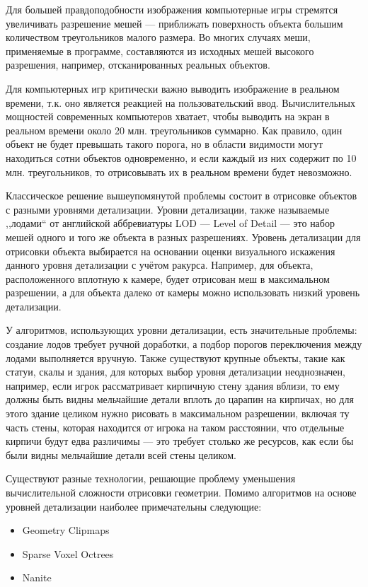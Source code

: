 Для большей правдоподобности изображения компьютерные игры стремятся увеличивать разрешение мешей --- приближать поверхность объекта большим количеством треугольников малого размера.
Во многих случаях меши, применяемые в программе, составляются из исходных мешей высокого разрешения, например, отсканированных реальных объектов.

Для компьютерных игр критически важно выводить изображение в реальном времени, т.к. оно является реакцией на пользовательский ввод.
Вычислительных мощностей современных компьютеров хватает, чтобы выводить на экран в реальном времени около 20 млн. треугольников суммарно.
Как правило, один объект не будет превышать такого порога, но в области видимости могут находиться сотни объектов одновременно, и если каждый из них содержит по 10 млн. треугольников, то отрисовывать их в реальном времени будет невозможно.

Классическое решение вышеупомянутой проблемы состоит в отрисовке объектов с разными уровнями детализации.
Уровни детализации, также называемые ,,лодами`` от английской аббревиатуры LOD --- Level of Detail --- это набор мешей одного и того же объекта в разных разрешениях.
Уровень детализации для отрисовки объекта выбирается на основании оценки визуального искажения данного уровня детализации с учётом ракурса.
Например, для объекта, расположенного вплотную к камере, будет отрисован меш в максимальном разрешении, а для объекта далеко от камеры можно использовать низкий уровень детализации.

У алгоритмов, использующих уровни детализации, есть значительные проблемы: создание лодов требует ручной доработки, а подбор порогов переключения между лодами выполняется вручную.
Также существуют крупные объекты, такие как статуи, скалы и здания, для которых выбор уровня детализации неоднозначен, например, если игрок рассматривает кирпичную стену здания вблизи, то ему должны быть видны мельчайшие детали вплоть до царапин на кирпичах, но для этого здание целиком нужно рисовать в максимальном разрешении, включая ту часть стены, которая находится от игрока на таком расстоянии, что отдельные кирпичи будут едва различимы --- это требует столько же ресурсов, как если бы были видны мельчайшие детали всей стены целиком.

Существуют разные технологии, решающие проблему уменьшения вычислительной сложности отрисовки геометрии.
Помимо алгоритмов на основе уровней детализации наиболее примечательны следующие:
\begin{itemize}
    \item Geometry Clipmaps~\cite{GPUGems2GeometryClipmaps}
    \item Sparse Voxel Octrees~\cite{SparseVoxelOctrees}
    \item Nanite~\cite{NaniteManual}
\end{itemize}

